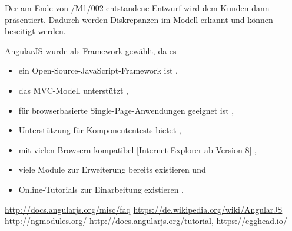 Der am Ende von /M1/002 entstandene Entwurf wird dem Kunden dann präsentiert. Dadurch werden Diskrepanzen im Modell erkannt und können beseitigt werden. 

AngularJS wurde als Framework gewählt, da es
\begin{itemize}
\item ein Open-Source-JavaScript-Framework ist \cite{[1]},
\item das MVC-Modell unterstützt \cite{[2]},
\item für browserbasierte Single-Page-Anwendungen geeignet ist \cite{[2]},
\item Unterstützung für Komponententests bietet \cite{[2]},
\item mit vielen Browsern kompatibel [Internet Explorer ab Version 8] \cite{[1]},
\item viele Module zur Erweiterung bereits existieren  \cite{[3]} und
\item Online-Tutorials zur Einarbeitung existieren \cite{[4]}.
\end{itemize}


\begin{thebibliography}{99}
\bibitem{[1]} \url{http://docs.angularjs.org/misc/faq}
\bibitem{[2]} \url{https://de.wikipedia.org/wiki/AngularJS}
\bibitem{[3]} \url{http://ngmodules.org/}
\bibitem{[4]} \url{http://docs.angularjs.org/tutorial}, \url{https://egghead.io/}
\end{thebibliography}

